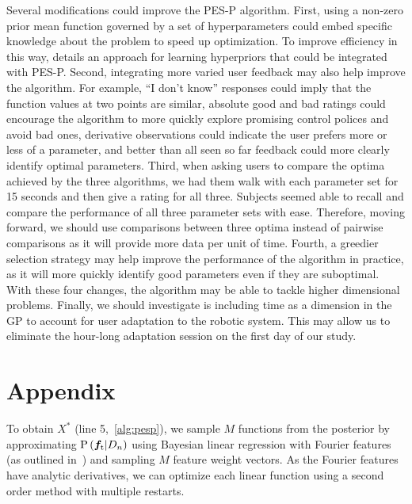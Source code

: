 Several modifications could improve the PES-P algorithm. First, using a non-zero
prior mean function governed by a set of hyperparameters could embed specific
knowledge about the problem to speed up optimization. To improve efficiency in
this way, \citep{brochu2010bayesian} details an approach for learning
hyperpriors that could be integrated with PES-P.  Second, integrating more
varied user feedback may also help improve the algorithm. For example, ``I don't
know'' responses could imply that the function values at two points are similar,
absolute good and bad ratings could encourage the algorithm to more quickly
explore promising control polices and avoid bad ones, derivative observations
could indicate the user prefers more or less of a parameter, and better than all
seen so far feedback could more clearly identify optimal parameters. Third, when
asking users to compare the optima achieved by the three algorithms, we had them
walk with each parameter set for 15 seconds and then give a rating for all
three. Subjects seemed able to recall and compare the performance of all three
parameter sets with ease. Therefore, moving forward, we should use comparisons
between three optima instead of pairwise comparisons as it will provide more
data per unit of time. Fourth, a greedier selection strategy may help improve
the performance of the algorithm in practice, as it will more quickly identify
good parameters even if they are suboptimal. With these four changes, the
algorithm may be able to tackle higher dimensional problems. Finally, we should
investigate is including time as a dimension in the GP to account for user
adaptation to the robotic system. This may allow us to eliminate the hour-long
adaptation session on the first day of our study. 

\hypertarget{sec:appendix}{\section*{Appendix}}

To obtain $X^*$ (line 5,~\cref{alg:pesp}), we sample $M$ functions from the
posterior by approximating $\prob{\vecf{f}[\tn{t}]|D_n}$ using Bayesian linear
regression with Fourier features (as outlined in~\citep{hernandez2014predictive})
and sampling $M$ feature weight vectors. As the Fourier features have analytic
derivatives, we can optimize each linear function using a second order method
with multiple restarts.

